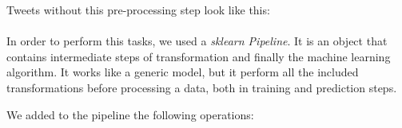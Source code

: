 Tweets without this pre-processing step look like this:\\

\\

In order to perform this tasks, we used a \textit{sklearn Pipeline}. It is an object that contains intermediate steps of transformation and finally the machine learning algorithm. It works like a generic model, but it perform all the included transformations before processing a data, both in training and prediction steps.

We added to the pipeline the following operations:

